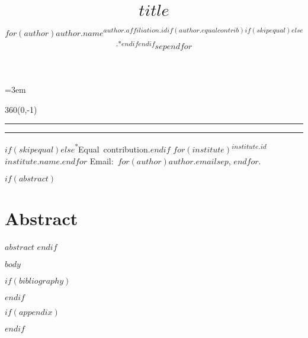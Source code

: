 \documentclass[letterpaper,12pt]{article}
\title{$title$}
\author{$for(author)$\mbox{$author.name$\textsuperscript{$author.affiliation.id$$if(author.equalcontrib)$$if(skipequal)$$else$,*$endif$$endif$}}$sep$\quad $endfor$}
\date{}
\begin{document}
\frenchspacing

\maketitle

\thispagestyle{fancy}
\parindent=3em
\setnowidow[2]

\newlength{\lmargin}
\setlength{\lmargin}{\dimexpr(\paperwidth-\textwidth)/2\relax}
\textblockorigin{\lmargin}{\paperheight}
\setlength{\TPHorizModule}{1pt}
\setlength{\TPVertModule}{1in}
\begin{textblock}{360}(0,-1)
    \parindent=0pt%
    \normalfont\scriptsize\raggedright%
    \hrule%
    \hrule%
    \vspace{1.5ex}%
    $if(skipequal)$$else$\mbox{\textsuperscript{*}Equal contribution.}\enskip$endif$%
    $for(institute)$\mbox{\textsuperscript{$institute.id$}$institute.name$.}\enskip$endfor$%
    Email:~$for(author)$\mbox{\texttt{$author.email$}}$sep$, $endfor$.%
\end{textblock}

$if(abstract)$
\section*{Abstract}
$abstract$
$endif$

$body$

$if(bibliography)$
\footnotesize


\normalsize
$endif$

$if(appendix)$
\renewcommand\thefigure{S\arabic{figure}}
\renewcommand\thetable{S\arabic{table}}
\setcounter{figure}{0}
\setcounter{table}{0}
\clearpage
\appendix

$endif$
\end{document}
